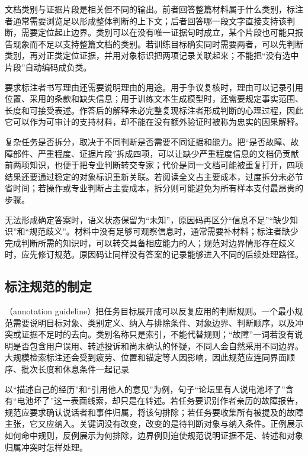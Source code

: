 文档类别与证据片段是相关但不同的输出。前者回答整篇材料属于什么类别，标注者通常需要浏览足以形成整体判断的上下文；后者回答哪一段文字直接支持该判断，需要定位起止边界。类别可以在没有唯一证据句时成立，某个片段也可能只报告现象而不足以支持整篇文档的类别。若训练目标确实同时需要两者，可以先判断类别，再对正类定位证据，并用对象标识把两项记录关联起来；不能把“没有选中片段”自动编码成负类。

要求标注者书写理由还需要说明理由的用途。用于争议复核时，理由可以记录引用位置、采用的条款和缺失信息；用于训练文本生成模型时，还需要规定事实范围、长度和可接受表述。作答后的解释未必完整复现标注者形成判断的心理过程，因此它可以作为可审计的支持材料，却不能在没有额外验证时被称为忠实的因果解释。

复杂任务是否拆分，取决于不同判断是否需要不同证据和能力。把“是否故障、故障部件、严重程度、证据片段”拆成四项，可以让缺少严重程度信息的文档仍贡献前两项知识，也便于把专业判断转交专家；代价是同一文档可能被重复打开，四项结果还要通过稳定的对象标识重新关联。若阅读全文占主要成本，过度拆分未必节省时间；若操作或专业判断占主要成本，拆分则可能避免为所有样本支付最昂贵的步骤。

无法形成确定答案时，语义状态保留为“未知”，原因码再区分“信息不足”“缺少知识”和“规范歧义”。材料中没有足够可观察信息时，通常需要补材料；标注者缺少完成判断所需的知识时，可以转交具备相应能力的人；规范对边界情形存在歧义时，应先修订规范。原因码让同样没有答案的记录能够进入不同的后续处理路径。

\Needspace{95mm}
\subsection{标注规范的制定}
\label{sec:knowledge-acquisition-human-guideline}

（annotation guideline）把任务目标展开成可以反复应用的判断规则。一个最小规范需要说明目标对象、类别定义、纳入与排除条件、对象边界、判断顺序，以及冲突或证据不足时的去向。类别名称只是索引，不能代替规则；“故障”一词若没有说明是否包含用户误用、转述投诉和尚未确认的怀疑，不同人会自然采用不同边界。大规模检索标注还会受到疲劳、位置和锚定等人因影响，因此规范应连同界面顺序、批次长度和休息条件一起记录

以“描述自己的经历”和“引用他人的意见”为例，句子“论坛里有人说电池坏了”含有“电池坏了”这一表面线索，却只是在转述。若任务要识别作者亲历的故障报告，规范应要求确认说话者和事件归属，将该句排除；若任务要收集所有被提及的故障主张，它又应纳入。关键词没有改变，改变的是待判断对象与纳入条件。正例展示如何命中规则，反例展示为何排除，边界例则迫使规范说明证据不足、转述和对象归属冲突时怎样处理。


